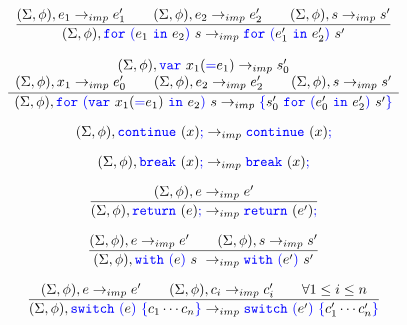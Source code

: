 \documentclass[a4paper]{article}
\newcommand{\code}[1]{\textcolor{blue}{\tt #1}}
\begin{document}
\begin{equation*}
\frac{
    (\Sigma, \phi), e_1 \rightarrow_{imp} e'_1 \qquad
    (\Sigma, \phi), e_2 \rightarrow_{imp} e'_2 \qquad
    (\Sigma, \phi), s \rightarrow_{imp} s'
}{
    (\Sigma, \phi), \code{for}\ \code{(} e_1\ \code{in}\ e_2 \code{)}\ s \rightarrow_{imp} \code{for}\ \code{(} e'_1\ \code{in}\ e'_2 \code{)}\ s'
}
\end{equation*}

\begin{equation*}
\frac{
    \begin{array}{c}
    (\Sigma, \phi), \code{var}\ x_1 (\code{=} e_1) \rightarrow_{imp} s'_0 \\
    (\Sigma, \phi), x_1 \rightarrow_{imp} e'_0 \qquad
    (\Sigma, \phi), e_2 \rightarrow_{imp} e'_2 \qquad
    (\Sigma, \phi), s \rightarrow_{imp} s'
    \end{array}
}{
    (\Sigma, \phi), \code{for}\ \code{(} \code{var}\ x_1 (\code{=} e_1)\ \code{in}\ e_2 \code{)}\ s \rightarrow_{imp} \code{\{} s'_0\ \code{for}\ \code{(} e'_0\ \code{in}\ e'_2 \code{)}\ s' \code{\}}
}
\end{equation*}

\begin{equation*}
(\Sigma, \phi), \code{continue}\ (x)\code{;} \rightarrow_{imp} \code{continue}\ (x)\code{;}
\end{equation*}

\begin{equation*}
(\Sigma, \phi), \code{break}\ (x)\code{;} \rightarrow_{imp} \code{break}\ (x)\code{;}
\end{equation*}

\begin{equation*}
\frac{
    (\Sigma, \phi), e \rightarrow_{imp} e'
}{
    (\Sigma, \phi), \code{return}\ (e)\code{;} \rightarrow_{imp} \code{return}\ (e')\code{;}
}
\end{equation*}

\begin{equation*}
\frac{
    (\Sigma, \phi), e \rightarrow_{imp} e' \qquad
    (\Sigma, \phi), s \rightarrow_{imp} s'
}{
    (\Sigma, \phi), \code{with}\ \code{(} e \code{)}\ s\ \rightarrow_{imp} \code{with}\ \code{(} e' \code{)}\ s'
}
\end{equation*}

\begin{equation*}
\frac{
    (\Sigma, \phi), e \rightarrow_{imp} e' \qquad
    (\Sigma, \phi), c_i \rightarrow_{imp} c'_i \qquad \forall 1 \le i \le n
}{
    (\Sigma, \phi), \code{switch}\ \code{(} e \code{)}\ \code{\{} c_1 \cdots c_n \code{\}} \rightarrow_{imp} \code{switch}\ \code{(} e' \code{)}\ \code{\{} c'_1 \cdots c'_n \code{\}}
}
\end{equation*}
\end{document}
